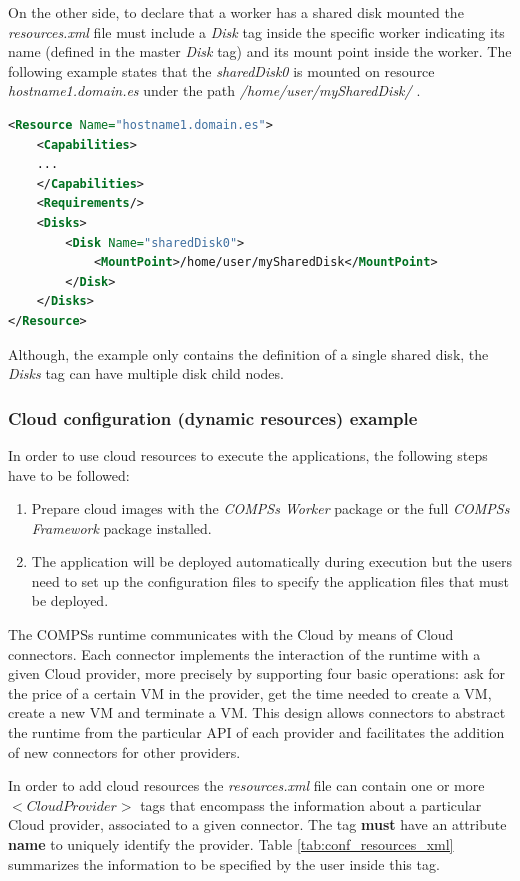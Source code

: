 On the other side, to declare that a worker has a shared disk mounted the \textit{resources.xml} file must include a \textit{Disk}
tag inside the specific worker indicating its name (defined in the master \textit{Disk} tag) and its mount point inside the worker.
The following example states that the \textit{sharedDisk0} is mounted on resource \textit{hostname1.domain.es} under the path
\textit{/home/user/mySharedDisk/} .
\begin{lstlisting}[language=xml]
<Resource Name="hostname1.domain.es">
    <Capabilities>
    ...
    </Capabilities>
    <Requirements/>
    <Disks>
        <Disk Name="sharedDisk0">
            <MountPoint>/home/user/mySharedDisk</MountPoint>
        </Disk>
    </Disks>
</Resource>
\end{lstlisting}

Although, the example only contains the definition of a single shared disk, the \textit{Disks} tag can have multiple 
disk child nodes.


\subsubsection{Cloud configuration (dynamic resources) example}
In order to use cloud resources to execute the applications, the following steps have to be followed:
\begin{enumerate}
 \item Prepare cloud images with the \textit{COMPSs Worker} package or the full \textit{COMPSs Framework} package installed.
 \item The application will be deployed automatically during execution but the users need to set up the configuration files to
 specify the application files that must be deployed. 
\end{enumerate}

The COMPSs runtime communicates with the Cloud by means of Cloud connectors. Each connector implements 
the interaction of the runtime with a given Cloud provider, more precisely by supporting four basic 
operations: ask for the price of a certain VM in the provider, get the time needed to create a VM, 
create a new VM and terminate a VM. This design allows connectors to abstract the runtime from the particular API
of each provider and facilitates the addition of new connectors for other providers.

In order to add cloud resources the \textit{resources.xml} file can contain one or more \textbf{$<CloudProvider>$} tags
that encompass the information about a particular Cloud provider, associated to a given connector. The tag \textbf{must} have an
attribute \textbf{name} to uniquely identify the provider. Table \ref{tab:conf_resources_xml} summarizes the information to be 
specified by the user inside this tag.

